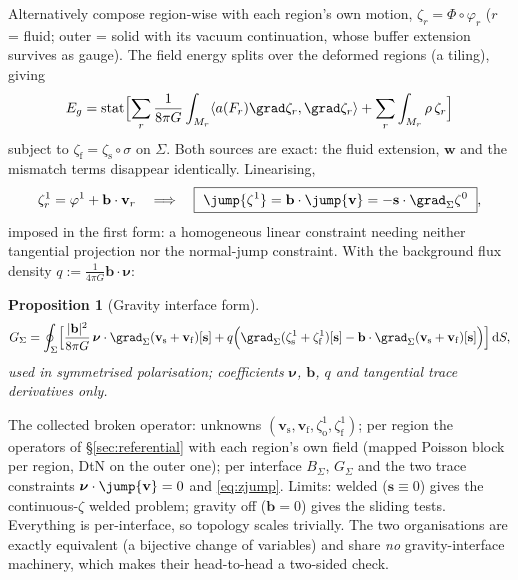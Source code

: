 \documentclass[11pt]{article}
\numberwithin{equation}{section}
\newtheorem{proposition}{Proposition}[section]
\theoremstyle{remark}
\newcommand{\dS}{\,\mathrm{d}S}
\newcommand{\vv}{\mathbf{v}}
\newcommand{\vw}{\mathbf{w}}
\newcommand{\vs}{\mathbf{s}}
\newcommand{\vb}{\mathbf{b}}
\newcommand{\bnu}{\bm{\nu}}
\begin{document}
Alternatively compose region-wise with each region's own motion, $\zeta_r
= \Phi\circ\varphi_r$ ($r$ = fluid; outer = solid with its vacuum
continuation, whose buffer extension survives as gauge). The field energy
splits over the deformed regions (a tiling), giving
\begin{equation}
  E_g = \operatorname{stat}\Bigl[\sum_r\frac{1}{8\pi G}\int_{M_r}
    \langle a(F_r)\grad\zeta_r,\grad\zeta_r\rangle
    + \sum_r\int_{M_r}\rho\,\zeta_r\Bigr]
\end{equation}
subject to $\zeta_{\mathrm{f}} = \zeta_{\mathrm{s}}\circ\sigma$ on
$\Sigma$. Both sources are exact: the fluid extension, $\vw$ and the
mismatch terms disappear identically. Linearising,
\begin{equation}
  \zeta^1_r = \varphi^1 + \vb\cdot\vv_r \quad\Longrightarrow\quad
  \boxed{\ \jump{\zeta^1} = \vb\cdot\jump{\vv} = -\vs\cdot\grad_\Sigma\zeta^0\ },
  \label{eq:zjump}
\end{equation}
imposed in the first form: a homogeneous linear constraint needing neither
tangential projection nor the normal-jump constraint. With the background
flux density $q := \frac{1}{4\pi G}\vb\cdot\bnu$:
\begin{proposition}[Gravity interface form]
\begin{equation}
  G_\Sigma = \oint_\Sigma\Bigl[\frac{|\vb|^2}{8\pi G}\,\bnu\cdot
     \grad_\Sigma(\vv_{\mathrm{s}}+\vv_{\mathrm{f}})[\vs]
   + q\Bigl(\grad_\Sigma(\zeta^1_{\mathrm{s}}+\zeta^1_{\mathrm{f}})[\vs]
     - \vb\cdot\grad_\Sigma(\vv_{\mathrm{s}}+\vv_{\mathrm{f}})[\vs]\Bigr)
   \Bigr]\dS,
\end{equation}
used in symmetrised polarisation; coefficients $\bnu$, $\vb$, $q$ and
tangential trace derivatives only.
\end{proposition}
The collected broken operator: unknowns $(\vv_{\mathrm{s}},\vv_{\mathrm{f}},
\zeta^1_{\mathrm{o}},\zeta^1_{\mathrm{f}})$; per region the operators of
\S\ref{sec:referential} with each region's own field (mapped Poisson block
per region, DtN on the outer one); per interface $B_\Sigma$, $G_\Sigma$ and
the two trace constraints $\bnu\cdot\jump{\vv} = 0$ and \eqref{eq:zjump}.
Limits: welded ($\vs\equiv0$) gives the continuous-$\zeta$ welded problem;
gravity off ($\vb = 0$) gives the sliding tests. Everything is
per-interface, so topology scales trivially. The two organisations are
exactly equivalent (a bijective change of variables) and share \emph{no}
gravity-interface machinery, which makes their head-to-head a two-sided
check.
\end{document}
